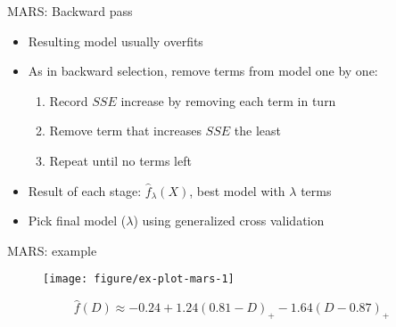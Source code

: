 \documentclass{beamer}
\begin{document}
\begin{frame}{MARS: Backward pass}
  \begin{itemize}[<+->]
    \item Resulting model usually overfits
    \item As in backward selection, remove terms from model one by one:
    \begin{enumerate}
      \item Record $SSE$ increase by removing each term in turn
      \item Remove term that increases $SSE$ the least
      \item Repeat until no terms left
    \end{enumerate}
    \item Result of each stage: $\hat{f}_{\lambda}(X)$, best model with $\lambda$ terms
    \item Pick final model ($\lambda$) using generalized cross validation 
  \end{itemize}

\end{frame}





\begin{frame}[t]{MARS: example}

\begin{figure}[!htbp]
\begin{center}
  \texttt{[image: figure/ex-plot-mars-1]}
\end{center}
\end{figure}
%
\begin{equation*}
  \label{eq:mars-eqn}
  \hat{f}(D) \approx -0.24 + 1.24 (0.81 - D)_{+} -1.64 (D - 0.87)_{+}
\end{equation*}

\end{frame}
\end{document}
